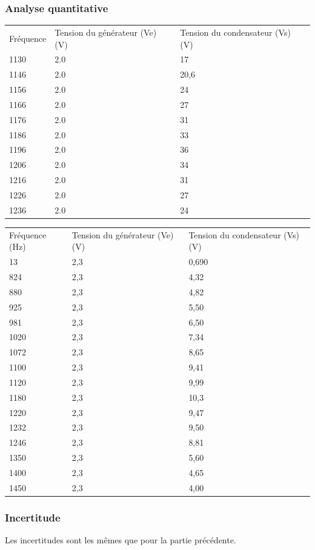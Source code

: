 \documentclass[a4paper,9pt,french]{scrartcl}
\begin{document}
\subsubsection{Analyse quantitative}
\begin{center}
\begin{tabular}{lll}
Fréquence & Tension du générateur (Ve) (V) & Tension du condensateur (Vs) (V)\\
1130 &2.0 & 17\\
1146 &2.0 & 20,6\\
1156 &2.0 & 24\\
1166 &2.0 & 27\\
1176 &2.0 & 31\\
1186 &2.0 & 33\\
1196 &2.0 & 36\\
1206 &2.0 & 34\\
1216 &2.0 & 31\\
1226 &2.0 & 27\\
1236 &2.0 & 24
\end{tabular}
\end{center}
\begin{center}
\begin{tabular}{lll}
Fréquence (Hz) & Tension du générateur (Ve) (V) & Tension du condensateur (Vs) (V)\\
13 & 2,3 & 0,690\\
824 & 2,3 & 4,32\\
880 & 2,3 & 4,82\\
925 & 2,3 & 5,50\\
981 & 2,3 & 6,50\\
1020 & 2,3 & 7,34\\
1072 & 2,3 & 8,65\\
1100 & 2,3 & 9,41\\
1120 & 2,3 & 9,99\\
1180 & 2,3 & 10,3\\
1220 & 2,3 & 9,47\\
1232 & 2,3 & 9,50\\
1246 & 2,3 & 8,81\\
1350 & 2,3 & 5,60\\
1400 & 2,3 & 4,65\\
1450 & 2,3 & 4,00
\end{tabular}
\end{center}
\subsubsection{Incertitude}
Les incertitudes sont les m\^emes que pour la partie précédente.
\end{document}
